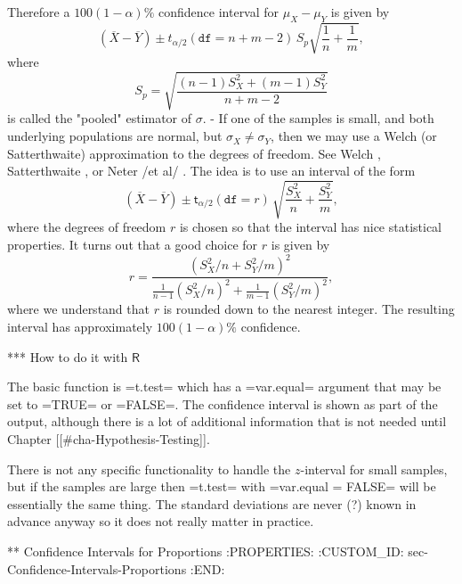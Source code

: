   Therefore a \(100(1-\alpha)\%\) confidence interval for
  \(\mu_{X}-\mu_{Y}\) is given by
  \begin{equation}
  \left(\overline{X}-\overline{Y}\right)\pm t_{\alpha/2}(\mathtt{df}=n+m-2)\, S_{p}\sqrt{\frac{1}{n}+\frac{1}{m}},
  \end{equation}
  where
  \begin{equation}
  S_{p}=\sqrt{\frac{(n-1)S_{X}^{2}+(m-1)S_{Y}^{2}}{n+m-2}}
  \end{equation}
  is called the "pooled" estimator of \(\sigma\).
    - If one of the samples is small, and both underlying populations
      are normal, but \(\sigma_{X}\neq\sigma_{Y}\), then we may use a
      Welch (or Satterthwaite) approximation to the degrees of
      freedom. See Welch \cite{Welch1947}, Satterthwaite
      \cite{Satterthwaite1946}, or Neter /et al/ \cite{Neter1996}. The
      idea is to use an interval of the form
      \begin{equation}
      \left(\overline{X}-\overline{Y}\right)\pm\mathsf{t}_{\alpha/2}(\mathtt{df}=r)\,\sqrt{\frac{S_{X}^{2}}{n}+\frac{S_{Y}^{2}}{m}},
      \end{equation}
      where the degrees of freedom \(r\) is chosen so that the
      interval has nice statistical properties. It turns out that a
      good choice for \(r\) is given by
      \begin{equation}
      r=\frac{\left(S_{X}^{2}/n+S_{Y}^{2}/m\right)^{2}}{\frac{1}{n-1}\left(S_{X}^{2}/n\right)^{2}+\frac{1}{m-1}\left(S_{Y}^{2}/m\right)^{2}},
      \end{equation}
      where we understand that \(r\) is rounded down to the nearest
      integer. The resulting interval has approximately
      \(100(1-\alpha)\%\) confidence.

*** How to do it with \(\mathsf{R}\)

The basic function is =t.test= which has a =var.equal= argument that
may be set to =TRUE= or =FALSE=. The confidence interval is shown as
part of the output, although there is a lot of additional information
that is not needed until Chapter [[#cha-Hypothesis-Testing]].

There is not any specific functionality to handle the \(z\)-interval
for small samples, but if the samples are large then =t.test= with
=var.equal = FALSE= will be essentially the same thing. The standard
deviations are never (?) known in advance anyway so it does not really
matter in practice.

** Confidence Intervals for Proportions
:PROPERTIES:
:CUSTOM_ID: sec-Confidence-Intervals-Proportions
:END:

